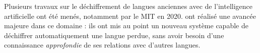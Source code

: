 \documentclass[12pt, twoside]{report}
\begin{document}
Plusieurs travaux sur le déchiffrement de langues anciennes avec de l'intelligence artificielle ont été menés, notamment par le MIT en 2020. \autocite{luo-et-al-2020} ont réalisé une avancée majeure dans ce domaine : ils ont mis au point un nouveau système capable de déchiffrer automatiquement une langue perdue, sans avoir besoin d'une connaissance \textit{approfondie} de ses relations avec d'autres langues.

\end{document}
